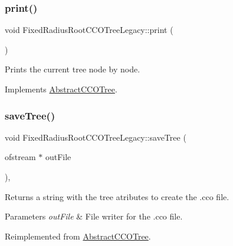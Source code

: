 \subsubsection{\texorpdfstring{print()}{print()}}
{\footnotesize\ttfamily void Fixed\+Radius\+Root\+C\+C\+O\+Tree\+Legacy\+::print (\begin{DoxyParamCaption}{ }\end{DoxyParamCaption})\hspace{0.3cm}{\ttfamily [virtual]}}

Prints the current tree node by node. 

Implements \mbox{\hyperlink{class_abstract_c_c_o_tree}{Abstract\+C\+C\+O\+Tree}}.

\mbox{\label{class_fixed_radius_root_c_c_o_tree_legacy_ae37ce4b6bd66712303927b7d67df3eb0}} 
\subsubsection{\texorpdfstring{save\+Tree()}{saveTree()}}
{\footnotesize\ttfamily void Fixed\+Radius\+Root\+C\+C\+O\+Tree\+Legacy\+::save\+Tree (\begin{DoxyParamCaption}\item[{ofstream $\ast$}]{out\+File }\end{DoxyParamCaption})\hspace{0.3cm}{\ttfamily [protected]}, {\ttfamily [virtual]}}

Returns a string with the tree atributes to create the .cco file. 
\begin{DoxyParams}{Parameters}
{\em out\+File} & File writer for the .cco file. \\
\hline
\end{DoxyParams}


Reimplemented from \mbox{\hyperlink{class_abstract_c_c_o_tree}{Abstract\+C\+C\+O\+Tree}}.

\mbox{\label{class_fixed_radius_root_c_c_o_tree_legacy_a1b36d4046bc3d3ac897eec5d1cec0308}} 
